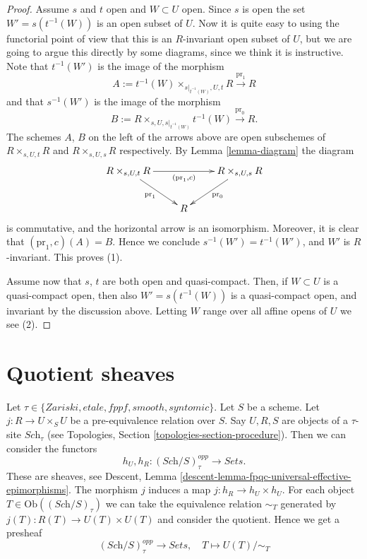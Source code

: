 \begin{proof}
Assume $s$ and $t$ open and $W \subset U$ open.
Since $s$ is open the set $W' = s(t^{-1}(W))$ is an open subset of $U$.
Now it is quite easy to using the functorial point of view
that this is an $R$-invariant open subset of $U$, but we are going to argue
this directly by some diagrams, since we think it is instructive.
Note that $t^{-1}(W')$ is the image of the morphism
$$
A := t^{-1}(W) \times_{s|_{t^{-1}(W)}, U, t} R
\xrightarrow{\text{pr}_1} R
$$
and that $s^{-1}(W')$ is the image of the morphism
$$
B := R \times_{s, U, s|_{t^{-1}(W)}} t^{-1}(W)
\xrightarrow{\text{pr}_0} R.
$$
The schemes $A$, $B$ on the left of the arrows above are open subschemes of
$R \times_{s, U, t} R$ and $R \times_{s, U, s} R$ respectively.
By Lemma \ref{lemma-diagram} the diagram
$$
\xymatrix{
R \times_{s, U, t} R \ar[rd]_{\text{pr}_1} \ar[rr]_{(\text{pr}_1, c)} & &
R \times_{s, U, s} R \ar[ld]^{\text{pr}_0} \\
& R &
}
$$
is commutative, and the horizontal arrow is an isomorphism. Moreover, it is
clear that $(\text{pr}_1, c)(A) = B$. Hence we conclude
$s^{-1}(W') = t^{-1}(W')$, and $W'$ is $R$-invariant. This proves (1).

\medskip\noindent
Assume now that $s$, $t$ are both open and quasi-compact.
Then, if $W \subset U$ is a quasi-compact open, then also
$W' = s(t^{-1}(W))$ is a quasi-compact open, and invariant by the
discussion above. Letting $W$ range over all affine opens of $U$
we see (2).
\end{proof}





\section{Quotient sheaves}
\label{section-quotient-sheaves}

\noindent
Let $\tau \in \{Zariski, etale, fppf, smooth, syntomic\}$.
Let $S$ be a scheme.
Let $j : R \to U\times_S U$ be a pre-equivalence relation over $S$.
Say $U, R, S$ are objects of a $\tau$-site $\textit{Sch}_\tau$
(see Topologies, Section \ref{topologies-section-procedure}).
Then we can consider the functors
$$
h_U, h_R :
(\textit{Sch}/S)_\tau^{opp}
\longrightarrow
\textit{Sets}.
$$
These are sheaves, see
Descent, Lemma \ref{descent-lemma-fpqc-universal-effective-epimorphisms}.
The morphism $j$ induces a map $j : h_R \to h_U \times h_U$.
For each object $T \in \text{Ob}((\textit{Sch}/S)_\tau)$
we can take the equivalence relation $\sim_T$ generated by
$j(T) : R(T) \to U(T) \times U(T)$ and consider the quotient.
Hence we get a presheaf
\begin{equation}
\label{equation-quotient-presheaf}
(\textit{Sch}/S)_\tau^{opp}
\longrightarrow
\textit{Sets},\quad
T \longmapsto U(T)/\sim_T
\end{equation}

